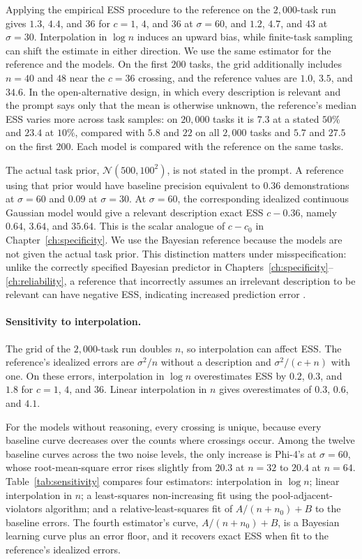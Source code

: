 Applying the empirical ESS procedure to the reference on the $2{,}000$-task run gives $1.3$, $4.4$, and $36$ for $c = 1$, $4$, and $36$ at $\sigma = 60$, and $1.2$, $4.7$, and $43$ at $\sigma = 30$. Interpolation in $\log n$ induces an upward bias, while finite-task sampling can shift the estimate in either direction. We use the same estimator for the reference and the models. On the first $200$ tasks, the grid additionally includes $n = 40$ and $48$ near the $c = 36$ crossing, and the reference values are $1.0$, $3.5$, and $34.6$. In the open-alternative design, in which every description is relevant and the prompt says only that the mean is otherwise unknown, the reference's median ESS varies more across task samples: on $20{,}000$ tasks it is $7.3$ at a stated $50\%$ and $23.4$ at $10\%$, compared with $5.8$ and $22$ on all $2{,}000$ tasks and $5.7$ and $27.5$ on the first $200$. Each model is compared with the reference on the same tasks.

The actual task prior, $\mathcal{N}(500,100^2)$, is not stated in the prompt. A reference using that prior would have baseline precision equivalent to $0.36$ demonstrations at $\sigma = 60$ and $0.09$ at $\sigma = 30$. At $\sigma = 60$, the corresponding idealized continuous Gaussian model would give a relevant description exact ESS $c-0.36$, namely $0.64$, $3.64$, and $35.64$. This is the scalar analogue of $c-c_0$ in Chapter~\ref{ch:specificity}. We use the Bayesian reference because the models are not given the actual task prior. This distinction matters under misspecification: unlike the correctly specified Bayesian predictor in Chapters~\ref{ch:specificity}--\ref{ch:reliability}, a reference that incorrectly assumes an irrelevant description to be relevant can have negative ESS, indicating increased prediction error \citep{reimherr2021}.

\paragraph{Sensitivity to interpolation.}
The grid of the $2{,}000$-task run doubles $n$, so interpolation can affect ESS. The reference's idealized errors are $\sigma^2/n$ without a description and $\sigma^2/(c+n)$ with one. On these errors, interpolation in $\log n$ overestimates ESS by $0.2$, $0.3$, and $1.8$ for $c = 1$, $4$, and $36$. Linear interpolation in $n$ gives overestimates of $0.3$, $0.6$, and $4.1$.

For the models without reasoning, every crossing is unique, because every baseline curve decreases over the counts where crossings occur. Among the twelve baseline curves across the two noise levels, the only increase is Phi-4's at $\sigma = 60$, whose root-mean-square error rises slightly from $20.3$ at $n = 32$ to $20.4$ at $n = 64$. Table~\ref{tab:sensitivity} compares four estimators: interpolation in $\log n$; linear interpolation in $n$; a least-squares non-increasing fit using the pool-adjacent-violators algorithm; and a relative-least-squares fit of $A/(n+n_0)+B$ to the baseline errors. The fourth estimator's curve, $A/(n+n_0)+B$, is a Bayesian learning curve plus an error floor, and it recovers exact ESS when fit to the reference's idealized errors.

